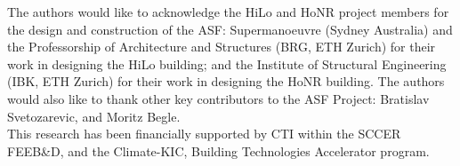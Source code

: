 
The authors would like to acknowledge the HiLo and HoNR project members for the design and construction of the ASF: Supermanoeuvre (Sydney Australia) and the Professorship of Architecture and Structures (BRG, ETH Zurich) for their work in designing the HiLo building; and the Institute of Structural Engineering (IBK, ETH Zurich) for their work in designing the HoNR building. The authors would also like to thank other key contributors to the ASF Project: Bratislav Svetozarevic, and Moritz Begle. \\

This research has been financially supported by CTI within the SCCER FEEB\&D, and the Climate-KIC, Building Technologies Accelerator program.
